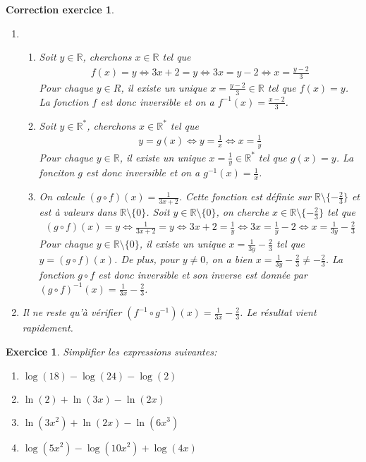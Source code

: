 \documentclass[12pt]{article}
\newtheorem{exercice}{\bf Exercice}
\newtheorem{correction}{\bf Correction exercice}
\newenvironment{exo}{
  \begin{exercice}\normalfont}{\end{exercice}
}
\newenvironment{cor}{
\begin{correction}\smallskip\normalfont}{\end{correction}
}
\newcommand*{\R}{\mathbb{R}}
\newif\ifcorrige\corrigetrue
\begin{document}
\ifcorrige
\color{magenta}
\begin{cor}
  $\qquad$
\begin{enumerate}
\item
\begin{enumerate}
\item Soit $y \in \R$, cherchons $x \in \R$ tel que
  \begin{align*}
    f(x) = y
    \iff
    3x+2 = y
    \iff
    3x = y-2
    \iff
    x = \frac{y-2}{3}
  \end{align*}
  Pour chaque $y \in R$, il existe un unique $x = \frac{y-2}{3} \in \R$ tel que $f(x) = y$.
  La fonction $f$ est donc inversible et on a $f^{-1}(x) = \frac{x-2}{3}$.
\item Soit $y \in \R^*$, cherchons $x \in \R^*$ tel que
  \begin{align*}
    y = g(x)
    \iff
    y = \frac1x
    \iff
    x = \frac1y
  \end{align*}
  Pour chaque $y \in \R$, il existe un unique $x = \frac{1}{y} \in \R^*$ tel que $g(x) = y$.
  La fonciton $g$ est donc inversible et on a $g^{-1}(x) = \frac1x$.

\item On calcule $(g \circ f) (x) = \frac{1}{3x+2}$.
  Cette fonction est d\'efinie sur $\R \setminus \{ -\frac23 \}$ et est \`a valeurs dans $\R \setminus \{ 0 \}$.
  Soit $y \in \R \setminus \{ 0 \}$, on cherche $x \in \R \setminus \{ -\frac23 \}$
  tel que
  \begin{align*}
    (g \circ f) (x) = y
    \iff
    \frac{1}{3x+2} = y
    \iff
    3x+2 = \frac1y
    \iff
    3x = \frac1y - 2
    \iff
    x = \frac1{3y} - \frac23
  \end{align*}
  Pour chaque $y \in \R \setminus \{ 0 \}$, il existe un unique $x = \frac1{3y} - \frac23$
  tel que $y = (g \circ f) (x)$.
  De plus, pour $y \neq 0$, on a bien $x = \frac1{3y} - \frac23 \neq - \frac23$.
  La fonction $g \circ f$ est donc inversible et son inverse est donn\'ee par
  $(g \circ f)^{-1}(x) = \frac{1}{3x} - \frac23$.
\end{enumerate}
\item Il ne reste qu'\`a v\'erifier
  $(f^{-1} \circ g^{-1})(x) = \frac{1}{3x} - \frac23$.
  Le r\'esultat vient rapidement.
\end{enumerate}
\end{cor}
\color{black}
\fi


\begin{exo} Simplifier les expressions suivantes:
\begin{multicols}{2}
\begin{enumerate}
\item $\log(18) - \log(24) - \log(2)$
\item $\ln(2) + \ln(3x) - \ln (2x)$
\item $\ln(3x^2) + \ln(2x) - \ln (6x^3)$
\item $\log (5x^2) - \log(10x^2) + \log(4x)$
\end{enumerate}
\end{multicols}
\end{exo}
\end{document}
